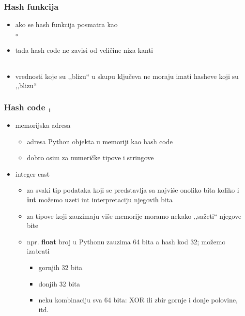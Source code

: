 \documentclass[compress,aspectratio=169]{beamer}
\begin{document}
\begin{frame}[fragile]
  \frametitle{Hash funkcija}
  \begin{itemize}
    \item ako se hash funkcija posmatra kao \\  $\circ$ 
    \item tada hash code ne zavisi od veličine niza kanti \\ \ \\
    \item vrednosti koje su ,,blizu`` u skupu ključeva ne moraju imati hasheve koji su ,,blizu`` 
  \end{itemize}
\end{frame}

\begin{frame}[fragile]
  \frametitle{Hash code $_1$}
  \begin{itemize}
    \item memorijska adresa
    \begin{itemize}
      \item adresa Python objekta u memoriji kao hash code
      \item dobro osim za numeričke tipove i stringove
    \end{itemize}
    \item integer cast 
    \begin{itemize}
      \item za svaki tip podataka koji se predstavlja sa najviše onoliko bita koliko i \textbf{int} možemo uzeti int interpretaciju njegovih bita
      \item za tipove koji zauzimaju više memorije moramo nekako ,,sažeti`` njegove bite
      \item npr. \textbf{float} broj u Pythonu zauzima 64 bita a hash kod 32; možemo izabrati
      \begin{itemize}
        \item gornjih 32 bita
        \item donjih 32 bita
        \item neku kombinaciju sva 64 bita: XOR ili zbir gornje i donje polovine, itd.
      \end{itemize}
    \end{itemize}
  \end{itemize}
\end{frame}
\end{document}
